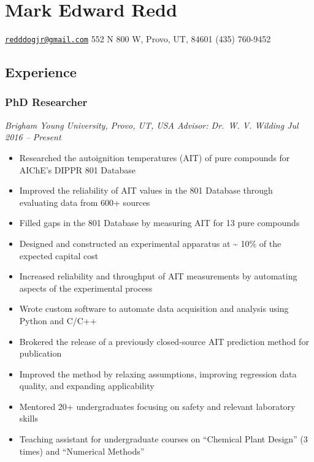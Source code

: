 
\hypertarget{mark-edward-redd}{%
\section{Mark Edward Redd}\label{mark-edward-redd}}

\href{mailto:redddogjr@gmail.com}{\nolinkurl{redddogjr@gmail.com}}
\textbar{} 552 N 800 W, Provo, UT, 84601 \textbar{} (435) 760-9452


\hypertarget{experience}{%
\subsection{Experience}\label{experience}}

\hypertarget{phd-researcher}{%
\subsubsection{PhD Researcher}\label{phd-researcher}}

\emph{Brigham Young University, Provo, UT, USA \textbar{} Advisor:
Dr.~W. V. Wilding \textbar{} Jul 2016 -- Present}

\begin{itemize}
\tightlist
\item
  Researched the autoignition temperatures (AIT) of pure compounds for
  AIChE's DIPPR 801 Database
\item
  Improved the reliability of AIT values in the 801 Database through
  evaluating data from 600+ sources
\item
  Filled gaps in the 801 Database by measuring AIT for 13 pure compounds
\item
  Designed and constructed an experimental apparatus at
  \textasciitilde{} 10\% of the expected capital cost
\item
  Increased reliability and throughput of AIT measurements by automating
  aspects of the experimental process
\item
  Wrote custom software to automate data acquisition and analysis using
  Python and C/C++
\item
  Brokered the release of a previously closed-source AIT prediction
  method for publication
\item
  Improved the method by relaxing assumptions, improving regression data
  quality, and expanding applicability
\item
  Mentored 20+ undergraduates focusing on safety and relevant laboratory
  skills
\item
  Teaching assistant for undergraduate courses on ``Chemical Plant
  Design'' (3 times) and ``Numerical Methods''
\end{itemize}

